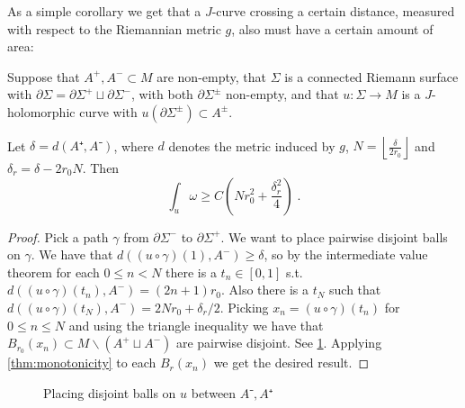 \documentclass[12pt,a4paper,abstract=true,draft]{scrartcl}
\begin{document}
As a simple corollary we get that a $J$-curve crossing a certain distance, measured with respect to the Riemannian metric $g$, also must have a certain amount of area:

\begin{corollary}
  \label{thm:small_buffer}
  Suppose that $A^+, A^- ⊂ M$ are non-empty, that $Σ$ is a connected Riemann surface with $∂Σ = ∂Σ^+ ⊔ ∂Σ^-$, with both $∂Σ^±$ non-empty, and that $u\colon Σ → M$ is a $J$-holomorphic curve with $u(∂Σ^±) ⊂ A^±$.
  
  Let $δ=d(A⁺,A⁻)$, where $d$ denotes the metric induced by $g$, $N=\left\lfloor \frac{δ}{2r_0} \right\rfloor$ and $δ_r = δ-2r_0 N$.
  Then
  \[∫_u ω ≥ C(Nr_0^2+\frac{δ_r^2}{4}) \; .\]
\end{corollary}

\begin{proof}
  Pick a path $γ$ from $∂Σ^-$ to $∂Σ^+$.
  We want to place pairwise disjoint balls on $γ$.
  We have that $d((u ∘ γ) (1),A^-) ≥ δ$, so by the intermediate value theorem for each $0 ≤ n < N$ there is a $t_n ∈ [0,1]$ s.t.\ $d((u ∘ γ) (t_n),A^-) = (2n+1)r_0$.
  Also there is a $t_N$ such that $d((u ∘ γ) (t_N),A^-) = 2Nr_0 + δ_r/2$.
  Picking $x_n = (u ∘ γ)(t_n)$ for $0 ≤ n ≤ N$ and using the triangle inequality we have that $B_{r_0}(x_n) ⊂ M ∖ ( A^+ ⊔ A^-)$ are pairwise disjoint.
  See \cref{fig:small_buffer}.
  Applying \cref{thm:monotonicity} to each $B_r(x_n)$ we get the desired result.
\end{proof}

\begin{figure}
  \centering
  \caption{Placing disjoint balls on $u$ between $A⁻,A⁺$}
  \label{fig:small_buffer}
\end{figure}
\end{document}
